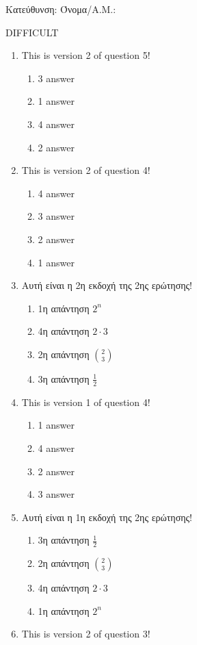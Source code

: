 \documentclass[a4paper, 11pt]{article}
\begin{document}
{\flushleft Κατεύθυνση: }
{\flushleft Όνομα/Α.Μ.: }
\vspace*{0.5cm}
\begin{center} {\Large  DIFFICULT } \end{center}
\begin{enumerate}
\item This is version 2 of question 5!
\begin{enumerate}[(1)]
    \item 3 answer
    \item 1 answer
    \item 4 answer
    \item 2 answer
\end{enumerate}
\item This is version 2 of question 4!
\begin{enumerate}[(1)]
    \item 4 answer
    \item 3 answer
    \item 2 answer
    \item 1 answer
\end{enumerate}
\item Αυτή είναι η 2η εκδοχή της 2ης ερώτησης!
\begin{enumerate}[(1)]
    \item 1η απάντηση $2^n$
    \item 4η απάντηση $2\cdot 3$
    \item 2η απάντηση $\binom{2}{3}$
    \item 3η απάντηση $\frac{1}{2}$
\end{enumerate}
\item This is version 1 of question 4!
\begin{enumerate}[(1)]
    \item 1 answer
    \item 4 answer
    \item 2 answer
    \item 3 answer
\end{enumerate}
\item Αυτή είναι η 1η εκδοχή της 2ης ερώτησης!
\begin{enumerate}[(1)]
    \item 3η απάντηση $\frac{1}{2}$
    \item 2η απάντηση $\binom{2}{3}$
    \item 4η απάντηση $2\cdot 3$
    \item 1η απάντηση $2^n$
\end{enumerate}
\item This is version 2 of question 3!

\end{enumerate}
\end{document}
